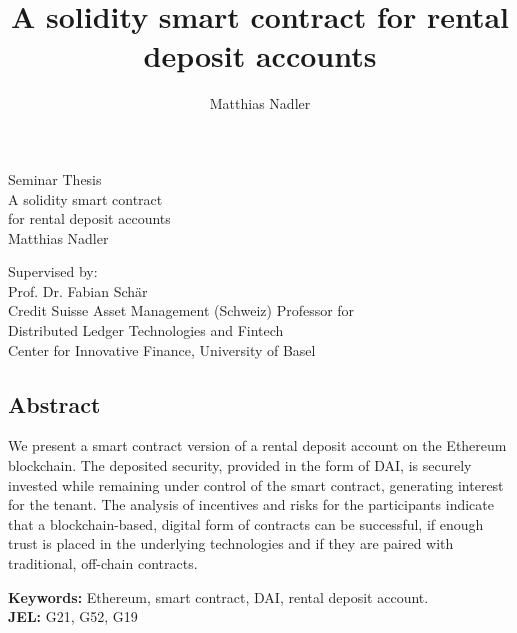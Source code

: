 \documentclass[12pt,a4paper,titlepage,oneside,english]{article}
\title{A solidity smart contract for rental deposit accounts}
\author{Matthias Nadler}
\begin{document}
\begin{center}
\vspace{1em}
\large{Seminar Thesis}\\
\huge A solidity smart contract \\
for rental deposit accounts \\
\Large \vspace{1em}
Matthias Nadler
\end{center}

\vspace{1em}
\normalsize
\begin{flushleft}
Supervised by:\\ 
Prof. Dr. Fabian Schär \\
Credit Suisse Asset Management (Schweiz) Professor for \\ 
Distributed Ledger Technologies and Fintech \\
Center for Innovative Finance, University of Basel
\end{flushleft}

\vspace{1em}
\onehalfspacing
\begin{center}
\section*{Abstract}
\end{center}
We present a smart contract version of a rental deposit account on the Ethereum blockchain. The deposited security, provided in the form of DAI, is securely invested while remaining under control of the smart contract, generating interest for the tenant. The analysis of incentives and risks for the participants indicate that a blockchain-based, digital form of contracts can be successful, if enough trust is placed in the underlying technologies and if they are paired with traditional, off-chain contracts.

\vfill
\textbf{Keywords:} Ethereum, smart contract, DAI, rental deposit account.\\
\noindent\textbf{JEL:} G21, G52, G19



\end{document}
